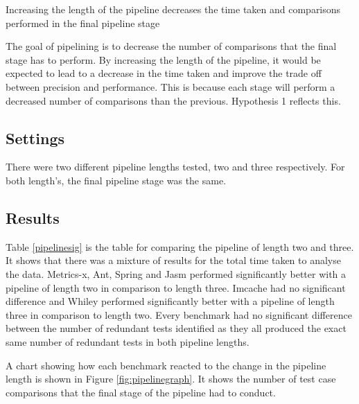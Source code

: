 \begin{hyp}
Increasing the length of the pipeline decreases the time taken and comparisons performed in the final pipeline stage
\end{hyp}

The goal of pipelining is to decrease the number of comparisons that the final stage has to perform. By increasing the length of the pipeline, it would be expected to lead to a decrease in the time taken and improve the trade off between precision and performance. This is because each stage will perform a decreased number of comparisons than the previous. Hypothesis 1 reflects this.

\subsection{Settings}
There were two different pipeline lengths tested, two and three respectively. For both length's, the final pipeline stage was the same.

\subsection{Results}

Table \ref{pipelinesig} is the table for comparing the pipeline of length two and three. It shows that there was a mixture of results for the total time taken to analyse the data. Metrics-x, Ant, Spring and Jasm performed significantly better with a pipeline of length two in comparison to length three. Imcache had no significant difference and Whiley performed significantly better with a pipeline of length three in comparison to length two. Every benchmark had no significant difference between the number of redundant tests identified as they all produced the exact same number of redundant tests in both pipeline lengths.

A chart showing how each benchmark reacted to the change in the pipeline length is shown in Figure \ref{fig:pipelinegraph}. It shows the number of test case comparisons that the final stage of the pipeline had to conduct.

